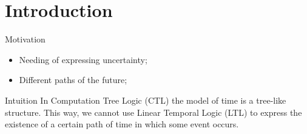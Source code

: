 \section{Introduction}
\begin{frame}{Motivation}
	\begin{itemize}
		\item 
		{
			Needing of expressing uncertainty;
			\pause
		} 
		\item 
		{
			Different paths of the future;
		}
	\end{itemize}
\end{frame}
\begin{frame}{Intuition}
	In Computation Tree Logic (CTL) the model of time is a tree-like structure. This way, we cannot use Linear Temporal Logic (LTL) to express the existence of a certain path of time in which some event occurs.
\end{frame}

